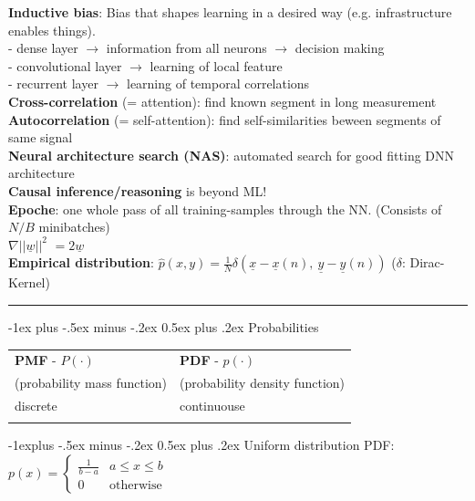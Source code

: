 \documentclass[a4paper,10pt,landscape]{article}
\makeatletter
\renewcommand{\section}{\@startsection{section}{1}{0mm}%
                                {-1ex plus -.5ex minus -.2ex}%
                                {0.5ex plus .2ex}%
                                {\normalfont\large\bfseries}}
\renewcommand{\subsection}{\@startsection{subsection}{2}{0mm}%
                                {-1explus -.5ex minus -.2ex}%
                                {0.5ex plus .2ex}%
                                {\normalfont\normalsize\bfseries}}
\newcommand{\x}{\underline{x}}
\newcommand{\y}{\underline{y}}
\makeatother
\begin{document}
\begin{multicols*}{3}
    \textbf{Inductive bias}: Bias that shapes learning in a desired way (e.g. infrastructure enables things).\\
    - dense layer $\rightarrow$ information from all neurons $\rightarrow$ decision making\\
    - convolutional layer $\rightarrow$ learning of local feature\\
    - recurrent layer $\rightarrow$ learning of temporal correlations\\
    
    \textbf{Cross-correlation} (= attention): find known segment in long measurement \\
    \textbf{Autocorrelation} (= self-attention): find self-similarities beween segments of same signal\\
    \textbf{Neural architecture search (NAS)}: automated search for good fitting DNN architecture\\
    \textbf{Causal inference/reasoning} is beyond ML!\\
    \textbf{Epoche}: one whole pass of all training-samples through the NN. (Consists of $N/B$ minibatches) \\
    {\boldmath $\nabla ||\underline{w}||^2$} $ = 2 \underline{w}$\\
    \textbf{Empirical distribution}: $\hat{p}(x,y) = \frac{1}{N}\delta(\x - \x(n), \ \y - \y(n))$ ($\delta$: Dirac-Kernel)


    \hrule
    \section{Probabilities}
    
    \begin{tabular}{p{4cm}|p{4cm}}
        \textbf{PMF} - $P(\cdot)$  & \textbf{PDF} - $p(\cdot)$ \\
       (probability mass function) & (probability density function)\\
        discrete & continuouse \\
         & \\
    \end{tabular}
    \subsection{Uniform distribution}
     PDF: $ p(x)= \left\{\begin{array}{ll} \frac{1}{b-a} & a\leq x \leq b \\
         0 & \textrm{otherwise}
		\end{array}\right.$ \\

\end{multicols*}
\end{document}
